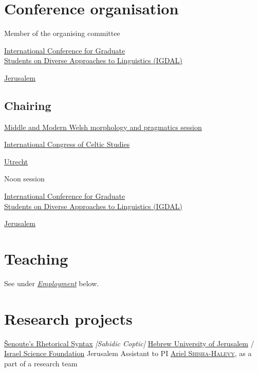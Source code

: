 \section{Conference organisation}

	{Member of the organising committee}
	{\parbox[t]{0.8\textwidth}{\href{https://igdal.wordpress.com/}{ International Conference for Graduate\\Students on Diverse Approaches to Linguistics (IGDAL)}}}
	{\href{https://huji.ac.il/}{Jerusalem}}
	{}
	{}



\subsection{Chairing}

	{\href{https://celticstudiescongress.sites.uu.nl/wp-content/uploads/sites/649/2023/07/Abstract-Booklet-ICCS-2023_DEFv22072023.pdf}{Middle and Modern Welsh morphology and pragmatics session}}
	{\parbox[t]{0.8\textwidth}{\href{https://celticstudiescongress.sites.uu.nl/}{ International Congress of Celtic Studies}}}
	{\href{https://uu.nl/}{Utrecht}}
	{}
	{}

	{Noon session}
	{\parbox[t]{0.8\textwidth}{\href{https://igdal.wordpress.com/}{ International Conference for Graduate\\Students on Diverse Approaches to Linguistics (IGDAL)}}}
	{\href{https://huji.ac.il/}{Jerusalem}}
	{}
	{}



\section{Teaching}

See under \hyperref[sec:employment]{\emph{Employment}} below.



\section{Research projects}

	{\href{https://doi.org/10.5913/jcscs.2020.89237654}{Šenoute’s Rhetorical Syntax} \emph{[Sahidic Coptic]}}
	{\href{https://huji.ac.il/}{Hebrew University of Jerusalem} / \href{https://isf.org.il/}{Israel Science Foundation}}
	{Jerusalem}
	{}
	{Assistant to PI \href{https://arielshishahalevy.huji.ac.il/}{Ariel \textsc{Shisha-Halevy}}, as a part of a research team}



